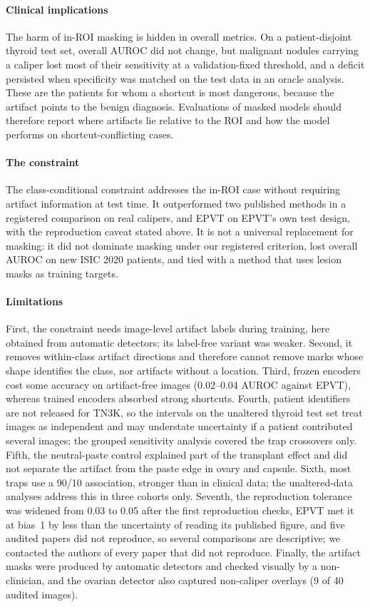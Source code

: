 \documentclass[12pt]{article}
\begin{document}
\paragraph{Clinical implications} The harm of in-ROI masking is hidden in overall metrics. On a patient-disjoint thyroid
test set, overall AUROC did not change, but malignant nodules carrying a caliper lost most of their sensitivity at a
validation-fixed threshold, and a deficit persisted when specificity was matched on the test data in an oracle analysis.
These are the patients for whom a shortcut is most dangerous, because the artifact points to the benign diagnosis.
Evaluations of masked models should therefore report where artifacts lie relative to the ROI and how the model performs on
shortcut-conflicting cases.

\paragraph{The constraint} The class-conditional constraint addresses the in-ROI case without requiring artifact
information at test time. It outperformed two published methods in a registered comparison on real calipers, and EPVT on
EPVT's own test design, with the reproduction caveat stated above. It is not a universal replacement for masking: it did
not dominate masking under our registered criterion, lost overall AUROC on new ISIC 2020 patients, and tied with a method
that uses lesion masks as training targets.

\paragraph{Limitations} First, the constraint needs image-level artifact labels during training, here obtained from
automatic detectors; its label-free variant was weaker. Second, it removes within-class artifact directions and therefore
cannot remove marks whose shape identifies the class, nor artifacts without a location. Third, frozen encoders cost some
accuracy on artifact-free images (0.02--0.04 AUROC against EPVT), whereas trained encoders absorbed strong shortcuts.
Fourth, patient identifiers are not released for TN3K, so the intervals on the unaltered thyroid test set treat images as
independent and may understate uncertainty if a patient contributed several images; the grouped sensitivity analysis
covered the trap crossovers only. Fifth, the neutral-paste control explained part of the transplant effect and did not
separate the artifact from the paste edge in ovary and capsule. Sixth, most traps use a 90/10 association, stronger than
in clinical data; the unaltered-data analyses address this in three cohorts only. Seventh, the reproduction tolerance was
widened from 0.03 to 0.05 after the first reproduction checks, EPVT met it at bias~1 by less than the uncertainty of
reading its published figure, and five audited papers did not reproduce, so several comparisons are descriptive; we
contacted the authors of every paper that did not reproduce. Finally, the artifact masks were produced by automatic
detectors and checked visually by a non-clinician, and the ovarian detector also captured non-caliper overlays (9 of 40
audited images).
\end{document}
